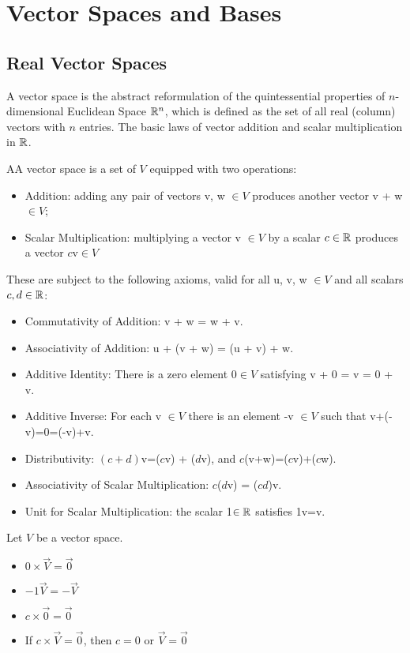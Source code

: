 \section{Vector Spaces and Bases}

\subsection{Real Vector Spaces}
  A vector space is the abstract reformulation of the quintessential properties of $n$-dimensional Euclidean Space $\mathbb{R}^n$, which is defined as the set of all real (column) vectors with $n$ entries. The basic laws of vector addition and scalar multiplication in $\mathbb{R}$.

  \begin{definition}
    AA vector space is a set of $V$ equipped with two operations:
    \begin{itemize}
      \item Addition: adding any pair of vectors v, w $\in V$ produces another vector v + w $\in V$;
      \item Scalar Multiplication: multiplying a vector v $\in V$ by a scalar $c\in\mathbb{R}$ produces a vector $c$v$\in V$
    \end{itemize}

    These are subject to the following axioms, valid for all u, v, w $\in V$ and all scalars $c,d\in\mathbb{R}$:
    \begin{itemize}
      \item Commutativity of Addition: v + w = w + v.
      \item Associativity of Addition: u + (v + w) = (u + v) + w.
      \item Additive Identity: There is a zero element $0\in V$ satisfying v + 0 = v = 0 + v.
      \item Additive Inverse: For each v $\in V$ there is an element -v $\in V$ such that v+(-v)=0=(-v)+v.
      \item Distributivity: $(c+d)$v=($c$v) + ($d$v), and $c$(v+w)=($c$v)+($c$w).
      \item Associativity of Scalar Multiplication: $c$($d$v) = ($cd$)v.
      \item Unit for Scalar Multiplication: the scalar 1$\in\mathbb{R}$ satisfies 1v=v.
    \end{itemize}
  \end{definition}

  \begin{theorem}
    Let $V$ be a vector space.
    \begin{itemize}
      \item $0\times\vec{V}=\vec{0}$
      \item $-1\vec{V}=-\vec{V}$
      \item $c\times\vec{0}=\vec{0}$
      \item If $c\times\vec{V}=\vec{0}$, then $c=0$ or $\vec{V}=\vec{0}$
    \end{itemize}
  \end{theorem}
  
